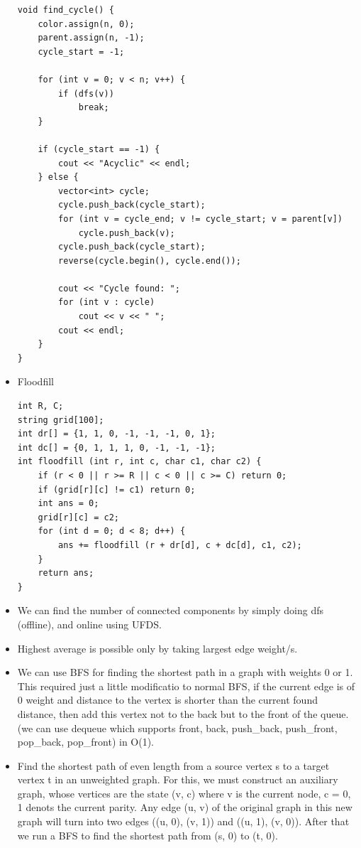 \documentclass[8pt, a4paper, oneside, twocolumn]{extarticle}
\begin{document}
\begin{itemize}
\begin{verbatim}
void find_cycle() {
    color.assign(n, 0);
    parent.assign(n, -1);
    cycle_start = -1;

    for (int v = 0; v < n; v++) {
        if (dfs(v))
            break;
    }

    if (cycle_start == -1) {
        cout << "Acyclic" << endl;
    } else {
        vector<int> cycle;
        cycle.push_back(cycle_start);
        for (int v = cycle_end; v != cycle_start; v = parent[v])
            cycle.push_back(v);
        cycle.push_back(cycle_start);
        reverse(cycle.begin(), cycle.end());

        cout << "Cycle found: ";
        for (int v : cycle)
            cout << v << " ";
        cout << endl;
    }
}
    \end{verbatim}
    \item Floodfill
    \begin{verbatim}
int R, C;
string grid[100];
int dr[] = {1, 1, 0, -1, -1, -1, 0, 1};
int dc[] = {0, 1, 1, 1, 0, -1, -1, -1};
int floodfill (int r, int c, char c1, char c2) {
    if (r < 0 || r >= R || c < 0 || c >= C) return 0;
    if (grid[r][c] != c1) return 0;
    int ans = 0;
    grid[r][c] = c2;
    for (int d = 0; d < 8; d++) {
        ans += floodfill (r + dr[d], c + dc[d], c1, c2);
    }
    return ans;
}
    \end{verbatim}
    \item We can find the number of connected components by simply doing dfs (offline), and online using UFDS.
    \item Highest average is possible only by taking largest edge weight/s. 
    \item We can use BFS for finding the shortest path in a graph with weights 0 or 1. This required just a little modificatio to normal BFS, if the current edge is of 0 weight and distance to the vertex is shorter than the current found distance, then add this vertex not to the back but to the front of the queue. (we can use dequeue which supports front, back, push\_{}back, push\_{}front, pop\_{}back, pop\_{}front) in O(1).
    \item Find the shortest path of even length from a source vertex s to a target vertex t in an unweighted graph. For this, we must construct an auxiliary graph, whose vertices are the state (v, c) where v is the current node, c = 0, 1 denots the current parity. Any edge (u, v) of the original graph in this new graph will turn into two edges ((u, 0), (v, 1)) and ((u, 1), (v, 0)). After that we run a BFS to find the shortest path from (s, 0) to (t, 0).

\end{itemize}
\end{document}
